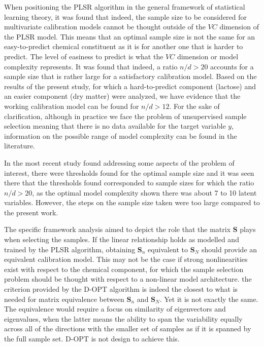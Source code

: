 \documentclass{article}
\begin{document}
When positioning the PLSR algorithm in the general framework of statistical learning theory, it was found that indeed, the sample size to be considered for multivariate calibration models cannot be thought outside of the $VC$ dimension of the PLSR model. This means that an optimal sample size is not the same for an easy-to-predict chemical constituent as it is for another one that is harder to predict. The level of easiness to predict is what the $VC$ dimension or model complexity represents. It was found that indeed, a ratio $n/d>20$ accounts for a sample size that is rather large for a satisfactory calibration model. Based on the results of the present study, for which a hard-to-predict component (lactose) and an easier component (dry matter) were analyzed, we have evidence that the working calibration model can be found for $n/d>12$. For the sake of clarification, although in practice we face the problem of unsupervised sample selection meaning that there is no data available for the target variable $y$, information on the possible range of model complexity can be found in the literature.

In the most recent study found addressing some aspects of the problem of interest, there were thresholds found for the optimal sample size and it was seen there that the thresholds found corresponded to sample sizes for which the ratio $n/d>20$, as the optimal model complexity shown there was about 7 to 10 latent variables. However, the steps on the sample size taken were too large compared to the present work. 

The specific framework analysis aimed to depict the role that the matrix $\mathbf{S}$ plays when selecting the samples. If the linear relationship holds as modelled and trained by the PLSR algorithm, obtaining $\mathbf{S}_n$ equivalent to $\mathbf{S}_N$ should provide an equivalent calibration model. This may not be the case if strong nonlinearities exist with respect to the chemical component, for which the sample selection problem should be thought with respect to a non-linear model architecture. the criterion provided by the D-OPT algorithm is indeed the closest to what is needed for matrix equivalence between $\mathbf{S}_n$ and $\mathbf{S}_N$. Yet it is not exactly the same. The equivalence would require a focus on similarity of eigenvectors and eigenvalues, when the latter means the ability to span the variability equally across all of the directions with the smaller set of samples as if it is spanned by the full sample set. D-OPT is not design to achieve this.
\end{document}
